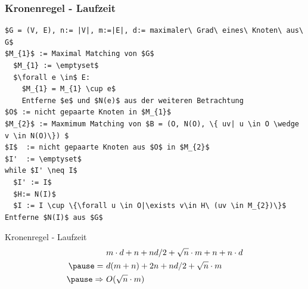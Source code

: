 \documentclass{beamer}
\begin{document}
\begin{frame}[fragile]
\frametitle{Kronenregel - Laufzeit}
\begin{lstlisting}[mathescape=true, escapechar = !,basicstyle=\ttfamily\scriptsize]
$G = (V, E), n:= |V|, m:=|E|, d:= maximaler\ Grad\ eines\ Knoten\ aus\ G$
$M_{1}$ := Maximal Matching von $G$
  $M_{1} := \emptyset$
  $\forall e \in$ E:
    $M_{1} = M_{1} \cup e$
    Entferne $e$ und $N(e)$ aus der weiteren Betrachtung
$O$ := nicht gepaarte Knoten in $M_{1}$
$M_{2}$ := Maxmimum Matching von $B = (O, N(O), \{ uv| u \in O \wedge v \in N(O)\}) $
$I$  := nicht gepaarte Knoten aus $O$ in $M_{2}$
$I'  := \emptyset$
while $I' \neq I$
  $I' := I$
  $H:= N(I)$
  $I := I \cup \{\forall u \in O|\exists v\in H\ (uv \in M_{2})\}$
Entferne $N(I)$ aus $G$
\end{lstlisting}
\end{frame}
\begin{frame}{Kronenregel - Laufzeit}
\begin{align*}
&\ m \cdot d + n + n d/2 + \sqrt{n} \cdot m + n  + n \cdot d \\ \pause
=&\ d (m+n) +2 n + nd/2 + \sqrt{n} \cdot m \\ \pause
\Rightarrow &\ O(\sqrt{n} \cdot m)
\end{align*}
\end{frame}
\end{document}
